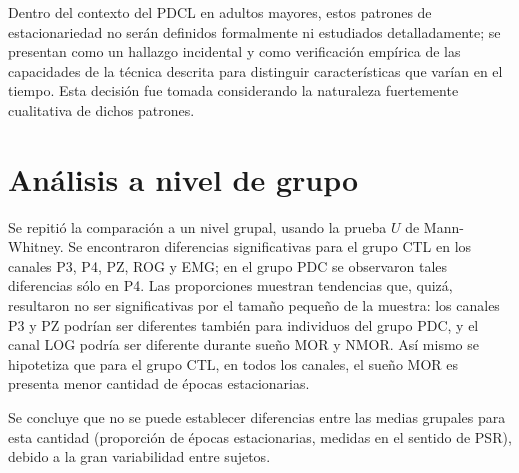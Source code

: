 Dentro del contexto del PDCL en adultos mayores, estos patrones de estacionariedad no serán definidos formalmente ni estudiados detalladamente; se presentan como un hallazgo incidental y como verificación empírica de las capacidades de la técnica descrita para distinguir características que varían en el tiempo.
%
Esta decisión fue tomada considerando la naturaleza fuertemente cualitativa de dichos patrones.




\section{Análisis a nivel de grupo}

Se repitió la comparación a un nivel grupal, usando la prueba $U$ de  Mann-Whitney.
Se encontraron diferencias significativas para el grupo CTL en los canales P3, P4, PZ, 
ROG y EMG; en el grupo PDC se observaron tales diferencias sólo en P4.
%
Las proporciones muestran tendencias que, quizá, resultaron no ser significativas
por el tamaño pequeño de la muestra: los canales P3 y PZ podrían ser diferentes también para
individuos del grupo PDC, y el canal LOG podría ser diferente durante sueño MOR y NMOR.
%
Así mismo se hipotetiza que para el grupo CTL, en todos los canales, el sueño MOR
es presenta menor cantidad de épocas estacionarias.

Se concluye que
no se puede establecer diferencias entre las medias grupales para esta cantidad (proporción de
épocas estacionarias, medidas en el sentido de PSR), debido a la gran variabilidad entre sujetos.



